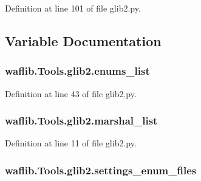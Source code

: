 Definition at line 101 of file glib2.\+py.



\subsection{Variable Documentation}
\subsubsection[{\texorpdfstring{enums\+\_\+list}{enums_list}}]{\setlength{\rightskip}{0pt plus 5cm}waflib.\+Tools.\+glib2.\+enums\+\_\+list}\hypertarget{namespacewaflib_1_1_tools_1_1glib2_af080f2e4a94c9c60680d4851c52ce608}{}\label{namespacewaflib_1_1_tools_1_1glib2_af080f2e4a94c9c60680d4851c52ce608}


Definition at line 43 of file glib2.\+py.

\subsubsection[{\texorpdfstring{marshal\+\_\+list}{marshal_list}}]{\setlength{\rightskip}{0pt plus 5cm}waflib.\+Tools.\+glib2.\+marshal\+\_\+list}\hypertarget{namespacewaflib_1_1_tools_1_1glib2_ae08b829c279f119cd3e4def700f1ebe2}{}\label{namespacewaflib_1_1_tools_1_1glib2_ae08b829c279f119cd3e4def700f1ebe2}


Definition at line 11 of file glib2.\+py.

\subsubsection[{\texorpdfstring{settings\+\_\+enum\+\_\+files}{settings_enum_files}}]{\setlength{\rightskip}{0pt plus 5cm}waflib.\+Tools.\+glib2.\+settings\+\_\+enum\+\_\+files}\hypertarget{namespacewaflib_1_1_tools_1_1glib2_aa8b977a232bdfb079752a90d72c8b41d}{}\label{namespacewaflib_1_1_tools_1_1glib2_aa8b977a232bdfb079752a90d72c8b41d}


